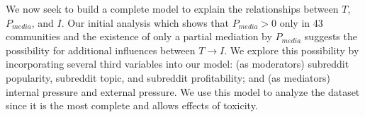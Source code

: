  We now seek to build
a complete model to explain the relationships between $T$, $P_{media}$, and
$I$. Our initial analysis which shows that $P_{media} > 0$ only in 43
communities and the existence of only a partial mediation by $P_{media}$
suggests the possibility for additional influences between $T\rightarrow I$. We
explore this possibility by incorporating several third variables into our
model: (as moderators) subreddit popularity, subreddit topic, and subreddit
profitability; and (as mediators) internal pressure and external pressure.
We use this model to analyze the  dataset since it is the most complete
and allows effects of toxicity.

